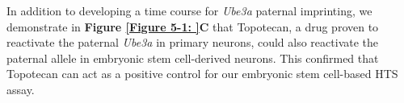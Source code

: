 In addition to developing a time course for \textit{Ube3a} paternal imprinting, we demonstrate in \textbf{Figure \ref{Figure 5-1: }C} that Topotecan, a drug proven to reactivate the paternal \textit{Ube3a} in primary neurons, could also reactivate the paternal allele in embryonic stem cell-derived neurons. This confirmed that Topotecan can act as a positive control for our embryonic stem cell-based HTS assay.


\begin{figure}[!h]
  \centering
\end{figure}
